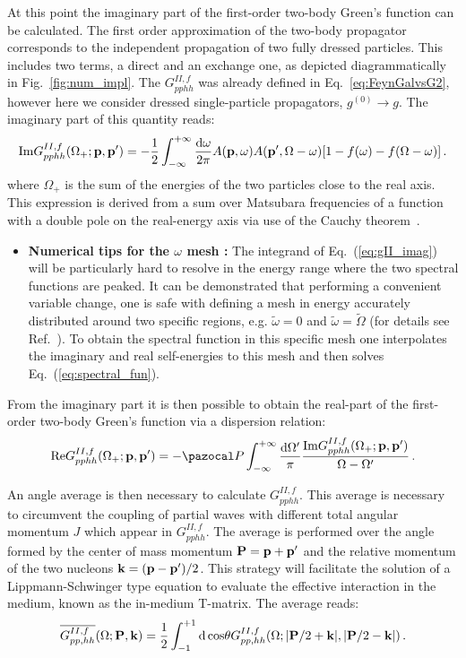  At this point the imaginary part of the first-order two-body Green's function can be calculated. The first order approximation of the two-body propagator corresponds to the independent propagation of two fully dressed particles. This includes two terms, a direct and an exchange one, as depicted diagrammatically in Fig.~\ref{fig:num_impl}. The $G^{II,f}_{pphh}$ was already defined in Eq.~\eqref{eq:FeynGalvsG2}, however here we consider dressed single-particle propagators, $g^{(0)}\rightarrow g$.
The imaginary part of this quantity reads:
\begin{equation}
\label{eq:gII_imag}
{\rm Im}G^{II,f}_{pphh}(\Omega_+;{\bf p},{\bf p'}) = -\frac{1}{2}\int_{-\infty}^{+\infty}\frac{{\rm d}{\omega}}{2\pi}A({\bf p},\omega)A({\bf p'},\Omega-\omega)[1-f(\omega)-f(\Omega-\omega)]\,.
\end{equation}
where $\Omega_+$ is the sum of the energies of the two particles close to the real axis. This expression is derived from a sum over Matsubara frequencies of a function with a double pole on the real-energy axis via use of the Cauchy theorem~\cite{ch11_Rios2007PhD}.
\begin{itemize}
\item {\bf Numerical tips for the $\omega$ mesh :} The integrand of Eq.~(\ref{eq:gII_imag}) will be particularly hard to resolve in the energy range where the two spectral functions are peaked. It can be demonstrated that performing a convenient variable change, one is safe with defining a mesh in energy accurately distributed around two specific regions, e.g. $\tilde\omega=0$ and $\tilde\omega=\tilde\Omega$ (for details see Ref.~\cite{ch11_Rios2007PhD}). To obtain the spectral function in this specific mesh one interpolates the imaginary and real self-energies to this mesh and then solves Eq.~(\ref{eq:spectral_fun}).
\end{itemize}

 From the imaginary part it is then possible to obtain the real-part of the first-order two-body Green's function via a dispersion relation:
\begin{equation}
{\rm Re}G^{II,f}_{pphh}(\Omega_+;{\bf p},{\bf p'}) = -{\pazocal P}\int_{-\infty}^{+\infty}\frac{{\rm d}{\Omega'}}{\pi}\frac{{\rm Im}G^{II,f}_{pphh}(\Omega_+;{\bf p},{\bf p'})}{\Omega-\Omega'}\,.
\end{equation}

 An angle average is then necessary to calculate $G^{II,f}_{pphh}$. This average is necessary to circumvent the coupling of partial waves with different total angular momentum $J$ which appear in $G^{II,f}_{pphh}$. The average is performed over the angle formed by the center of mass momentum ${\bf P}={\bf p}+{\bf p'}$ and the relative momentum of the two nucleons ${\bf k}=({\bf p}-{\bf p'})/2$. This strategy will facilitate the solution of a Lippmann-Schwinger type equation to evaluate the effective interaction in the medium, known as the in-medium T-matrix. The average reads:
\begin{equation}
\overline{G^{II,f}_{pp,hh}}(\Omega;{\bf P},{\bf k})=\frac{1}{2}\int_{-1}^{+1}{\rm d\,cos}\theta G^{II,f}_{pp,hh}(\Omega;|{\bf P}/2+{\bf k}|,|{\bf P}/2-{\bf k}|)\,.
\end{equation}

